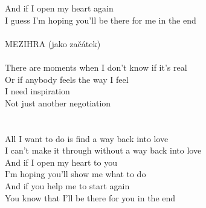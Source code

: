 And if I open my heart again\\
I guess I'm hoping you'll be there for me in the end\\
\\
MEZIHRA (jako začátek)\\
\\
\color{red}
There are moments when I don't know if it's real\\
Or if anybody feels the way I feel\\
I need inspiration\\
Not just another negotiation\\
\\
\\
\color{black}
All I want to do is find a way back into love\\
I can't make it through without a way back into love\\
And if I open my heart to you\\
I'm hoping you'll show me what to do\\
And if you help me to start again\\
You know that I'll be there for you in the end\\